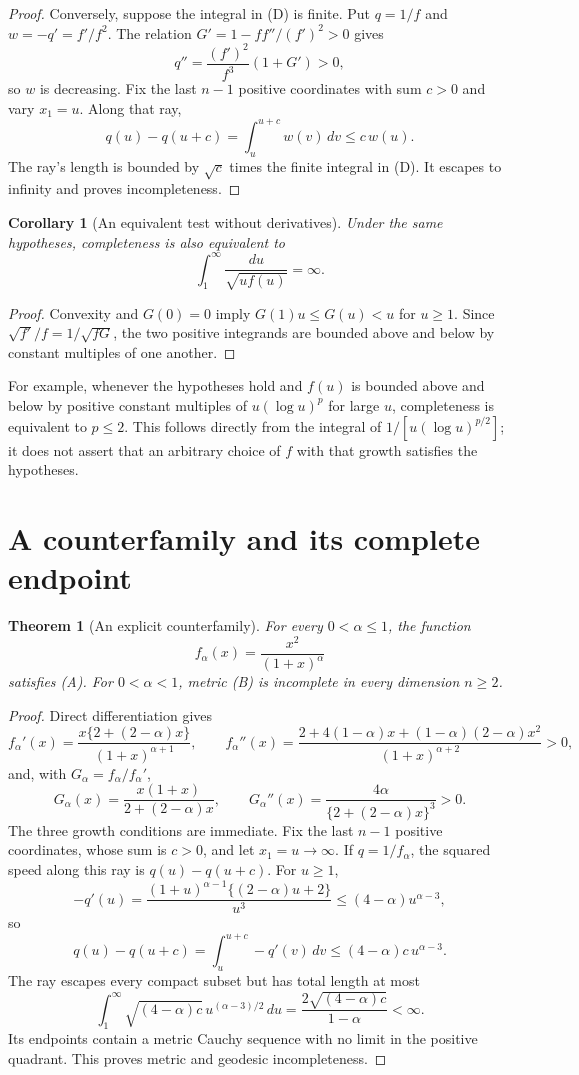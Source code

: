 \documentclass[11pt,a4paper]{article}
\newtheorem{theorem}{Theorem}
\newtheorem{corollary}{Corollary}
\begin{document}
\begin{proof}
Conversely, suppose the integral in (D) is finite. Put $q=1/f$ and
$w=-q'=f'/f^2$. The relation $G'=1-ff''/(f')^2>0$ gives
\[
 q''=\frac{(f')^2}{f^3}(1+G')>0,
\]
so $w$ is decreasing. Fix the last $n-1$ positive coordinates with sum
$c>0$ and vary $x_1=u$. Along that ray,
\[
 q(u)-q(u+c)=\int_u^{u+c}w(v)\,dv\le c\,w(u).
\]
The ray's length is bounded by $\sqrt c$ times the finite integral in
(D). It escapes to infinity and proves incompleteness.
\end{proof}


\begin{corollary}[An equivalent test without derivatives]
Under the same hypotheses, completeness is also equivalent to
\[
 \int_1^\infty \frac{du}{\sqrt{u f(u)}}=\infty.
\tag{D$'$}
\]
\end{corollary}
\begin{proof}
Convexity and $G(0)=0$ imply $G(1)u\le G(u)<u$ for $u\ge1$.
Since $\sqrt{f'}/f=1/\sqrt{fG}$, the two positive integrands
are bounded above and below by constant multiples of one another.
\end{proof}
For example, whenever the hypotheses hold and $f(u)$ is bounded above
and below by positive constant multiples of $u(\log u)^p$ for large
$u$, completeness is equivalent to $p\le2$. This follows directly
from the integral of $1/[u(\log u)^{p/2}]$; it does not assert that
an arbitrary choice of $f$ with that growth satisfies the hypotheses.

\section{A counterfamily and its complete endpoint}
\begin{theorem}[An explicit counterfamily]
For every $0<\alpha\le1$, the function
\[
 f_\alpha(x)=\frac{x^2}{(1+x)^\alpha}
\]
satisfies (A). For $0<\alpha<1$, metric (B) is incomplete in every
dimension $n\ge2$.
\end{theorem}
\begin{proof}
Direct differentiation gives
\[
 f_\alpha'(x)=\frac{x\{2+(2-\alpha)x\}}{(1+x)^{\alpha+1}},\qquad
 f_\alpha''(x)=
 \frac{2+4(1-\alpha)x+(1-\alpha)(2-\alpha)x^2}
      {(1+x)^{\alpha+2}}>0,
\]
and, with $G_\alpha=f_\alpha/f_\alpha'$,
\[
 G_\alpha(x)=\frac{x(1+x)}{2+(2-\alpha)x},\qquad
 G_\alpha''(x)=\frac{4\alpha}{\{2+(2-\alpha)x\}^3}>0.
\]
The three growth conditions are immediate.
Fix the last $n-1$ positive coordinates, whose sum is $c>0$, and let
$x_1=u\to\infty$. If $q=1/f_\alpha$, the squared speed along this ray is
$q(u)-q(u+c)$. For $u\ge1$,
\[
 -q'(u)=\frac{(1+u)^{\alpha-1}\{(2-\alpha)u+2\}}{u^3}
       \le(4-\alpha)u^{\alpha-3},
\]
so
\[
 q(u)-q(u+c)=\int_u^{u+c}-q'(v)\,dv
       \le(4-\alpha)c\,u^{\alpha-3}.
\]
The ray escapes every compact subset but has total length at most
\[
 \int_1^\infty\sqrt{(4-\alpha)c}\,u^{(\alpha-3)/2}\,du
 =\frac{2\sqrt{(4-\alpha)c}}{1-\alpha}<\infty.
\tag{C}
\]
Its endpoints contain a metric Cauchy sequence with no limit in the
positive quadrant. This proves metric and geodesic incompleteness.
\end{proof}
\end{document}
